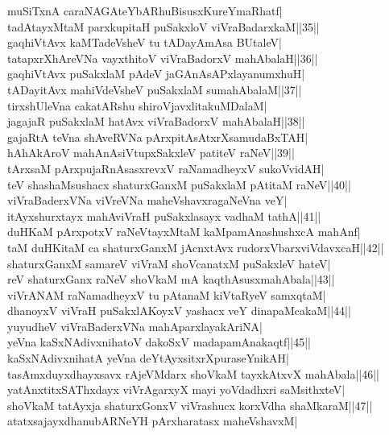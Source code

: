 \documentclass{article}
\begin{document}
muSiTxnA caraNAGAteYbARhuBisusxKureYmaRhatf|\\
tadAtayxMtaM parxkupitaH puSakxloV viVraBadarxkaM||35||\\
gaqhiVtAvx kaMTadeVsheV tu tADayAmAsa BUtaleV|\\
tatapxrXhAreVNa vayxthitoV viVraBadorxV mahAbalaH||36||\\
gaqhiVtAvx puSakxlaM pAdeV jaGAnAsAPxlayanumxhuH|\\
tADayitAvx mahiVdeVsheV puSakxlaM sumahAbalaM||37||\\
tirxshUleVna cakatARshu shiroVjavxlitakuMDalaM|\\
jagajaR puSakxlaM hatAvx viVraBadorxV mahAbalaH||38||\\
gajaRtA teVna shAveRVNa pArxpitAsAtxrXsamudaBxTAH|\\
hAhAkAroV mahAnAsiVtupxSakxleV patiteV raNeV||39||\\
tArxsaM pArxpujaRnAsasxrevxV raNamadheyxV sukoVvidAH|\\
teV shashaMsushacx shaturxGanxM puSakxlaM pAtitaM raNeV||40||\\
viVraBaderxVNa viVreVNa maheVshavxragaNeVna veY|\\
itAyxshurxtayx mahAviVraH puSakxlasayx vadhaM tathA||41||\\
duHKaM pArxpotxV raNeVtayxMtaM kaMpamAnashushxcA mahAnf|\\
taM duHKitaM ca shaturxGanxM jAcnxtAvx rudorxVbarxviVdavxcaH||42||\\
shaturxGanxM samareV viVraM shoVcanatxM puSakxleV hateV|\\
reV shaturxGanx raNeV shoVkaM mA kaqthAsusxmahAbala||43||\\
viVrANAM raNamadheyxV tu pAtanaM kiVtaRyeV samxqtaM|\\
dhanoyxV viVraH puSakxlAKoyxV yashacx veY dinapaMcakaM||44||\\
yuyudheV viVraBaderxVNa mahAparxlayakAriNA|\\
yeVna kaSxNAdivxnihatoV dakoSxV madapamAnakaqtf||45||\\
kaSxNAdivxnihatA yeVna deYtAyxsitxrXpuraseYnikAH|\\
tasAmxduyxdhayxsavx rAjeVMdarx shoVkaM tayxkAtxvX mahAbala||46||\\
yatAnxtitxSAThxdayx viVrAgarxyX mayi yoVdadhxri saMsithxteV|\\
shoVkaM tatAyxja shaturxGonxV viVrashucx korxVdha shaMkaraM||47||\\
atatxsajayxdhanubARNeYH pArxharatasx maheVshavxM|\\
\end{document}
